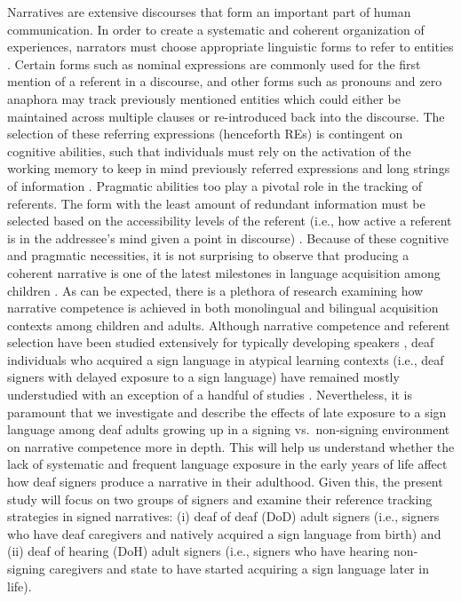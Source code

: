 \documentclass[review]{elsarticle} %
\begin{document}
Narratives are extensive discourses that form an important part of human
communication. In order to create a systematic and coherent organization
of experiences, narrators must choose appropriate linguistic forms to
refer to entities \citep{ariel1990, givon1983, gundel1993}. Certain
forms such as nominal expressions are commonly used for the first
mention of a referent in a discourse, and other forms such as pronouns
and zero anaphora may track previously mentioned entities which could
either be maintained across multiple clauses or re-introduced back into
the discourse. The selection of these referring expressions (henceforth
REs) is contingent on cognitive abilities, such that individuals must
rely on the activation of the working memory to keep in mind previously
referred expressions and long strings of information
\citep{morgan2005, bamberg1997}. Pragmatic abilities too play a pivotal
role in the tracking of referents. The form with the least amount of
redundant information must be selected based on the accessibility levels
of the referent (i.e., how active a referent is in the addressee's mind
given a point in discourse) \citep{ahn2019, ariel1990}. Because of these
cognitive and pragmatic necessities, it is not surprising to observe
that producing a coherent narrative is one of the latest milestones in
language acquisition among children \citep{hickmann1996}. As can be
expected, there is a plethora of research examining how narrative
competence is achieved in both monolingual and bilingual acquisition
contexts among children and adults. Although narrative competence and
referent selection have been studied extensively for typically
developing speakers \citep{aksu-koc2015, hickmann1996, williams1988},
deaf individuals who acquired a sign language in atypical learning
contexts (i.e., deaf signers with delayed exposure to a sign language)
have remained mostly understudied with an exception of a handful of
studies \citep{cormier2013, gur2018, becker2009}. Nevertheless, it is
paramount that we investigate and describe the effects of late exposure
to a sign language among deaf adults growing up in a signing
vs.~non-signing environment on narrative competence more in depth. This
will help us understand whether the lack of systematic and frequent
language exposure in the early years of life affect how deaf signers
produce a narrative in their adulthood. Given this, the present study
will focus on two groups of signers and examine their reference tracking
strategies in signed narratives: (i) deaf of deaf (DoD) adult signers
(i.e., signers who have deaf caregivers and natively acquired a sign
language from birth) and (ii) deaf of hearing (DoH) adult signers (i.e.,
signers who have hearing non-signing caregivers and state to have
started acquiring a sign language later in life).
\end{document}
